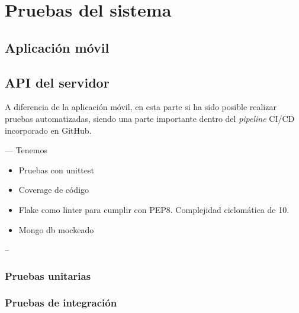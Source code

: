 \chapter{Pruebas del sistema}
\label{chapter:pruebas}
    \section{Aplicación móvil}
    \section{API del servidor}

A diferencia de la aplicación móvil, en esta parte si ha sido posible realizar pruebas automatizadas, siendo una parte importante dentro del \textit{pipeline} CI/CD incorporado en GitHub. 

---
Tenemos
\begin{itemize}
    \item Pruebas con unittest
    \item Coverage de código
    \item Flake como linter para cumplir con PEP8. Complejidad ciclomática de 10.
    \item Mongo db mockeado
\end{itemize}
--
    
        \subsection{Pruebas unitarias}
        \subsection{Pruebas de integración}

